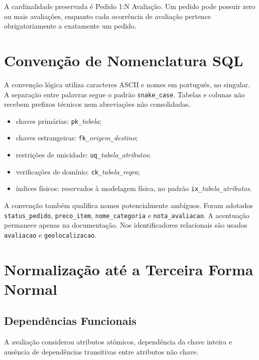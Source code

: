 \documentclass[12pt,a4paper]{article}
\begin{document}
	A cardinalidade preservada é Pedido 1:N Avaliação. Um pedido pode possuir zero
	ou mais avaliações, enquanto cada ocorrência de avaliação pertence
	obrigatoriamente a exatamente um pedido.

	\section{Convenção de Nomenclatura SQL}

	A convenção lógica utiliza caracteres ASCII e nomes em português, no singular.
	A separação entre palavras segue o padrão \texttt{snake\_case}. Tabelas e
	colunas não recebem prefixos técnicos nem abreviações não consolidadas.

	\begin{itemize}[leftmargin=1.2cm]
		\item chaves primárias: \texttt{pk\_}\textit{tabela};
		\item chaves estrangeiras: \texttt{fk\_}\textit{origem}\texttt{\_}\textit{destino};
		\item restrições de unicidade: \texttt{uq\_}\textit{tabela}\texttt{\_}\textit{atributos};
		\item verificações de domínio: \texttt{ck\_}\textit{tabela}\texttt{\_}\textit{regra};
		\item índices físicos: reservados à modelagem física, no padrão \texttt{ix\_}\textit{tabela}\texttt{\_}\textit{atributos}.
	\end{itemize}

	A convenção também qualifica nomes potencialmente ambíguos. Foram adotados
	\texttt{status\_pedido}, \texttt{preco\_item}, \texttt{nome\_categoria} e
	\texttt{nota\_avaliacao}. A acentuação permanece apenas na documentação. Nos
	identificadores relacionais são usados \texttt{avaliacao} e
	\texttt{geolocalizacao}.

	\section{Normalização até a Terceira Forma Normal}

	\subsection{Dependências Funcionais}

	A avaliação considerou atributos atômicos, dependência da chave inteira e
	ausência de dependências transitivas entre atributos não chave.
\end{document}
